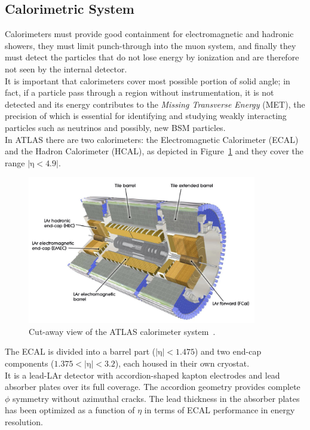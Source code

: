 \subsection{Calorimetric System}
\label{sec:CAL}
Calorimeters must provide good containment for electromagnetic and hadronic showers, they must limit punch-through into the muon system, and finally they must detect the particles that do not lose energy by ionization and are therefore not seen by the internal detector.\\
It is important that calorimeters cover most possible portion of solid angle; in fact, if a particle pass through a region without instrumentation, it is not detected and its energy contributes to the \textit{Missing 
Transverse Energy} (MET), the precision of which is essential for identifying and studying weakly interacting particles such as neutrinos and possibly, new BSM particles. \\
In ATLAS there are two calorimeters: the Electromagnetic Calorimeter (ECAL)  and the Hadron Calorimeter (HCAL), as depicted in Figure~\ref{fig:cal} and they cover the range $\mathrm{|\eta<4.9|}$.  
\begin{figure}[h]
	\centering
	\includegraphics[width=10cm]{Chapters/CH2/figures/cal}
	\caption{Cut-away view of the ATLAS calorimeter system~\cite{ATLAS}.}
	\label{fig:cal}
\end{figure}
\newpage 
\noindent The ECAL is divided into a barrel part ($\mathrm{|\eta|<1.475}$) and two end-cap components ($\mathrm{1.375<|\eta|<3.2}$), each housed in their own cryostat.\\
It is a lead-LAr detector with accordion-shaped kapton electrodes and lead absorber plates over its full coverage. The accordion geometry provides complete $\phi$ symmetry without azimuthal cracks.
The lead thickness in the absorber plates has been optimized as a function of $\eta$ in terms of ECAL performance in energy resolution. 
